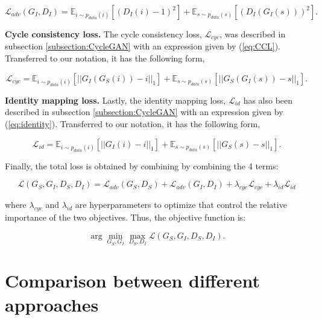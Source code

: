 \begin{equation}
    \mathcal{L}_{adv}(G_{I},D_I) = \mathbb{E}_{i \sim p_{data}(i)} [(D_I(i)-1)^2] + \mathbb{E}_{s \sim p_{data}(s)} [(D_I(G_{I}(s)))^2].
\end{equation}

\textbf{Cycle consistency loss.} The cycle consistency loss, $\mathcal{L}_{cyc}$, was described in subsection \ref{subsection:CycleGAN} with an expression given by (\ref{eq:CCL}). Transferred to our notation, it has the following form,

\begin{equation} 
\mathcal{L}_{cyc} = \mathbb{E}_{i \sim p_{data}(i)} [||G_{I}(G_{S}(i))-i||_1] + \mathbb{E}_{s \sim p_{data}(s)} [||G_{S}(G_{I}(s))-s||_1].
\label{eq:cly_2}
\end{equation}

\textbf{Identity mapping loss.} Lastly, the identity mapping loss, $\mathcal{L}_{id}$ has also been described in subsection \ref{subsection:CycleGAN} with an expression given by (\ref{eq:identity}). Transferred to our notation, it has the following form,

\begin{equation}
    \mathcal{L}_{id} = \mathbb{E}_{i \sim p_{data}(i)} [||G_{I}(i)-i||_1] +  \mathbb{E}_{s \sim p_{data}(s)} [||G_{S}(s)-s||_1].
\end{equation}

Finally, the total loss is obtained by combining by combining the 4 terms:

\begin{equation}
\label{eq:total-cyclegan-loss}
    \mathcal{L}(G_{S},G_{I},D_S,D_I) = \mathcal{L}_{adv}(G_{S},D_S) + \mathcal{L}_{adv}(G_{I},D_I) + \lambda_{cyc} \mathcal{L}_{cyc} + \lambda_{id} \mathcal{L}_{id}
\end{equation}

\noindent where $\lambda_{cyc}$ and $\lambda_{id}$ are hyperparameters to optimize that control the relative importance of the two objectives. Thus, the objective function is:

\begin{equation}
    \arg \min_{G_{S},G_{I}}\max_{D_S,D_I} \mathcal{L}(G_{S},G_{I},D_S,D_I).
\end{equation}

\section{Comparison between different approaches}
\label{section:comparison}

